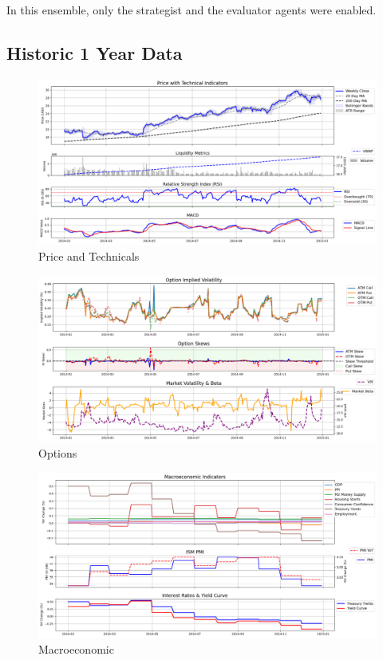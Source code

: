 \documentclass[8pt]{scrartcl}
\begin{document}
In this ensemble, only the strategist and the evaluator agents were enabled.

\subsection*{Historic 1 Year Data}

\begin{figure}[H]
    \centering
    \includegraphics[width=1\linewidth]{judge_reviews/AAPL_M_gpt-4o-mini//2015-01-01/judge_Price_with_Technical_Indicators.png}
    \caption{Price and Technicals}
\end{figure}

\begin{figure}[H]
    \centering
    \includegraphics[width=1\linewidth]{judge_reviews/AAPL_M_gpt-4o-mini/2015-01-01/judge_Option_Implied_Volatility.png}
    \caption{Options}
\end{figure}

\begin{figure}[H]
    \centering
    \includegraphics[width=1\linewidth]{judge_reviews/AAPL_M_gpt-4o-mini/2015-01-01/judge_Macroeconomic_Indicators.png}
    \caption{Macroeconomic}
\end{figure}
\end{document}
